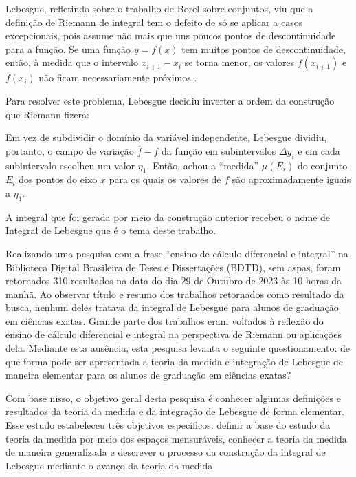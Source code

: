     \begin{citlon}
    	Lebesgue, refletindo sobre o trabalho de Borel sobre conjuntos, viu que a definição de Riemann de integral tem o defeito de só se aplicar a casos
    	excepcionais, pois assume não mais que uns poucos pontos de descontinuidade para a função.
    	Se uma função $y = f(x)$ tem muitos pontos de descontinuidade, então, à medida que o intervalo $x_{i+1} - x_i$
    	se torna menor, os valores $f(x_{i+1})$ e $f(x_i)$ não ficam
    	necessariamente próximos \cite[p.416]{boy}.  	
    \end{citlon}

    Para resolver este problema, Lebesgue decidiu inverter a ordem da construção que Riemann fizera:
    
    \begin{citlon}
    	Em vez de subdividir o domínio da variável independente, Lebesgue dividiu, portanto, o campo de variação $\overline{f} - f$ 
    	da função em subintervalos $\Delta y_i$ e em cada subintervalo
    	escolheu um valor $\eta_1$. 
    	Então, achou a \enquote{medida} $\mu(E_i)$ do conjunto $E_i$ dos pontos do eixo $x$ para os
    	quais os valores de $f$ são aproximadamente iguais a $\eta_1$\cite[p.416]{boy}.
    \end{citlon}
    
    A integral que foi gerada por meio da construção anterior recebeu o nome de Integral de Lebesgue que é o tema deste trabalho.
    
    Realizando uma pesquisa com a frase \enquote{ensino de cálculo diferencial e integral} na Biblioteca Digital Brasileira de Teses e Dissertações (BDTD), sem
    aspas, foram retornados 310 resultados na data do dia 29 de Outubro de 2023 às 10 horas da manhã.
    Ao observar título e resumo dos trabalhos retornados como resultado da busca, nenhum deles tratava da integral de Lebesgue para alunos de graduação em ciências exatas.
    Grande parte dos trabalhos eram voltados à reflexão do ensino de cálculo diferencial e integral na perspectiva de Riemann ou aplicações dela.
    Mediante esta ausência, esta pesquisa levanta o seguinte questionamento: de que forma pode ser apresentada a teoria da medida e integração de Lebesgue de maneira elementar para os alunos de graduação em ciências exatas?
    
    Com base nisso, o objetivo geral desta pesquisa é conhecer algumas definições e resultados da teoria da medida e da integração de Lebesgue de forma elementar.
    Esse estudo estabeleceu três objetivos específicos: 
    definir a base do estudo da teoria da medida por meio dos espaços mensuráveis,
    conhecer a teoria da medida de maneira generalizada e descrever o processo da construção da integral de Lebesgue mediante o avanço da teoria da medida.
    
